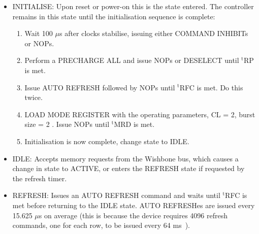 \begin{itemize}
  \item INITIALISE: Upon reset or power-on this is the state entered. The
  controller remains in this state until the initialisation sequence is
  complete:
  \begin{enumerate}
    \item Wait 100 $\mu$s after clocks stabilise, issuing either COMMAND
    INHIBITs or NOPs.
    \item Perform a PRECHARGE ALL and issue NOPs or DESELECT until
    $^{\mathrm{t}}$RP is met.
    \item Issue AUTO REFRESH followed by NOPs until $^{\mathrm{t}}$RFC is met.
    Do this twice.
    \item LOAD MODE REGISTER with the operating parameters, CL = 2, burst size
    = 2 . Issue NOPs until $^{\mathrm{t}}$MRD is met.
    \item Initialisation is now complete, change state to IDLE.
  \end{enumerate}
  \item IDLE: Accepts memory requests from the Wishbone bus, which causes a
  change in state to ACTIVE, or enters the REFRESH state if requested by the
  refresh timer.
  \item REFRESH: Issues an AUTO REFRESH command and waits until
  $^{\mathrm{t}}$RFC is met before returning to the IDLE state. AUTO REFRESHes
  are issued every 15.625 $\mu$s on average (this is because the device
  requires 4096 refresh commands, one for each row, to be issued every 64
  ms~\cite{Micron_SDRAM_DS}).
  

\end{itemize}
